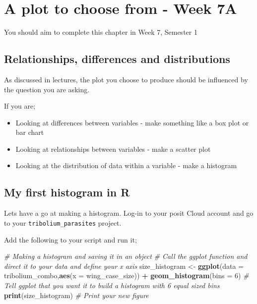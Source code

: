 \documentclass[
]{book}
\newenvironment{Shaded}{\begin{snugshade}}{\end{snugshade}}
\newcommand{\AttributeTok}[1]{\textcolor[rgb]{0.13,0.29,0.53}{#1}}
\newcommand{\CommentTok}[1]{\textcolor[rgb]{0.56,0.35,0.01}{\textit{#1}}}
\newcommand{\DecValTok}[1]{\textcolor[rgb]{0.00,0.00,0.81}{#1}}
\newcommand{\FunctionTok}[1]{\textcolor[rgb]{0.13,0.29,0.53}{\textbf{#1}}}
\newcommand{\NormalTok}[1]{#1}
\newcommand{\OtherTok}[1]{\textcolor[rgb]{0.56,0.35,0.01}{#1}}
\newcommand{\SpecialCharTok}[1]{\textcolor[rgb]{0.81,0.36,0.00}{\textbf{#1}}}
\providecommand{\tightlist}{%
  \setlength{\itemsep}{0pt}\setlength{\parskip}{0pt}}
\begin{document}
\hypertarget{histogram}{%
\chapter{A plot to choose from - Week 7A}\label{histogram}}

You should aim to complete this chapter in Week 7, Semester 1

\hypertarget{relationships-differences-and-distributions}{%
\section{Relationships, differences and distributions}\label{relationships-differences-and-distributions}}

As discussed in lectures, the plot you choose to produce should be influenced by the question you are asking.

If you are;

\begin{itemize}
\tightlist
\item
  Looking at differences between variables - make something like a box plot or bar chart
\item
  Looking at relationships between variables - make a scatter plot
\item
  Looking at the distribution of data within a variable - make a histogram
\end{itemize}

\hypertarget{my-first-histogram-in-r}{%
\section{My first histogram in R}\label{my-first-histogram-in-r}}

Lets have a go at making a histogram. Log-in to your posit Cloud account and go to your \texttt{tribolium\_parasites} project.

Add the following to your script and run it;

\begin{Shaded}
\begin{Highlighting}[]
\CommentTok{\# Making a histogram and saving it in an object}
\CommentTok{\# Call the ggplot function and direct it to your data and define your x axis}
\NormalTok{size\_histogram }\OtherTok{\textless{}{-}} \FunctionTok{ggplot}\NormalTok{(}\AttributeTok{data =}\NormalTok{ tribolium\_combo,}\FunctionTok{aes}\NormalTok{(}\AttributeTok{x =}\NormalTok{ wing\_case\_size)) }\SpecialCharTok{+} 
  \FunctionTok{geom\_histogram}\NormalTok{(}\AttributeTok{bins =} \DecValTok{6}\NormalTok{) }\CommentTok{\# Tell ggplot that you want it to build a histogram with 6 equal sized bins}
\FunctionTok{print}\NormalTok{(size\_histogram) }\CommentTok{\# Print your new figure}
\end{Highlighting}
\end{Shaded}
\end{document}
